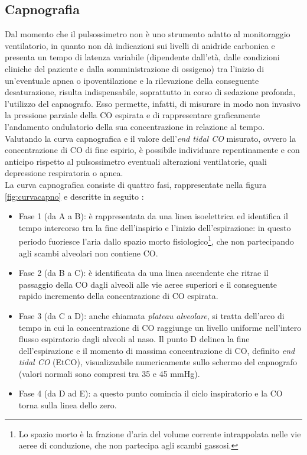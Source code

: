 \subsection*{Capnografia}
Dal momento che il pulsossimetro non è uno strumento adatto al monitoraggio ventilatorio, in quanto non dà indicazioni sui livelli di anidride carbonica e presenta un tempo di latenza variabile (dipendente dall'età, dalle condizioni cliniche del paziente e dalla somministrazione di ossigeno) tra l'inizio di un'eventuale apnea o ipoventilazione e la rilevazione della conseguente desaturazione, risulta indispensabile, soprattutto in corso di sedazione profonda, l'utilizzo del capnografo. Esso permette, infatti, di misurare in modo non invasivo la pressione parziale della CO espirata e di rappresentare graficamente l'andamento ondulatorio della sua concentrazione in relazione al tempo. Valutando la curva capnografica e il valore dell'\emph{end tidal CO} misurato, ovvero la concentrazione di CO di fine espirio, è possibile individuare repentinamente e con anticipo rispetto al pulsossimetro eventuali alterazioni ventilatorie, quali depressione respiratoria o apnea. 
\\La curva capnografica consiste di quattro fasi, rappresentate nella figura \ref{fig:curvacapno} e descritte in seguito \cite{Uptodatecapno}: 
\begin{itemize}
    \item Fase 1 (da A a B): è rappresentata da una linea isoelettrica ed identifica il tempo intercorso tra la fine dell’inspirio e l’inizio dell’espirazione: in questo periodo fuoriesce l'aria dallo spazio morto fisiologico\footnote{Lo spazio morto è la frazione d'aria del volume corrente intrappolata nelle vie aeree di conduzione, che non partecipa agli scambi gassosi.}, che non partecipando agli scambi alveolari non contiene CO.
    \item Fase 2 (da B a C): è identificata da una linea ascendente che ritrae il passaggio della CO dagli alveoli alle vie aeree superiori e il conseguente rapido incremento della concentrazione di CO espirata.
    \item Fase 3 (da C a D): anche chiamata \emph{plateau alveolare}, si tratta dell'arco di tempo in cui la concentrazione di CO raggiunge un livello uniforme nell'intero flusso espiratorio dagli alveoli al naso. Il punto D delinea la fine dell'espirazione e il momento di massima concentrazione di CO, definito \emph{end tidal CO} (EtCO), visualizzabile numericamente sullo schermo del capnografo (valori normali sono compresi tra 35 e 45 mmHg).
    \item Fase 4 (da D ad E): a questo punto comincia il ciclo inspiratorio e la CO torna sulla linea dello zero. 
    
\end{itemize}

